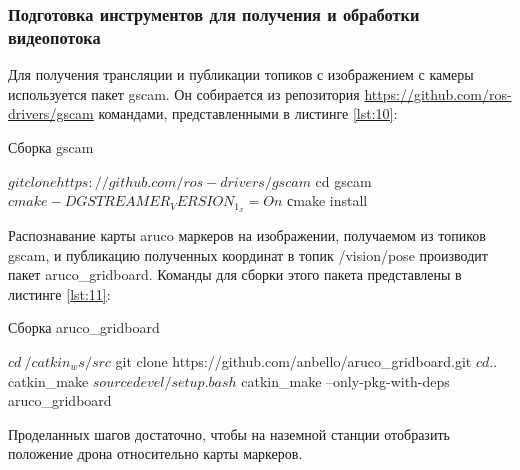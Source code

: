 \subsubsection{Подготовка инструментов для получения и обработки видеопотока}
Для получения трансляции и публикации топиков с изображением с камеры используется пакет gscam. Он собирается из репозитория \url{https://github.com/ros-drivers/gscam} командами, представленными в листинге \ref{lst:10}:
\begin{Program}[H]
	\caption{Сборка gscam} \label{lst:10}
	\begin{MyCode}
	$ git clone https://github.com/ros-drivers/gscam
	$ cd gscam
	$ cmake -DGSTREAMER_VERSION_1_x=On
	$ сmake install
	\end{MyCode}
\end{Program}

Распознавание карты aruco маркеров на изображении, получаемом из топиков gscam, и публикацию полученных координат в топик /vision/pose производит пакет aruco\_gridboard. Команды для сборки этого пакета представлены в листинге \ref{lst:11}:
\begin{Program}[H]
	\caption{Сборка aruco\_gridboard} \label{lst:11}
	\begin{MyCode}	
	$ cd ~/catkin_ws/src
	$ git clone https://github.com/anbello/aruco_gridboard.git
	$ cd ..
	$ catkin_make
	$ source devel/setup.bash
	$ catkin_make --only-pkg-with-deps aruco_gridboard
	\end{MyCode}
\end{Program}

Проделанных шагов достаточно, чтобы на наземной станции отобразить положение дрона относительно карты маркеров.
